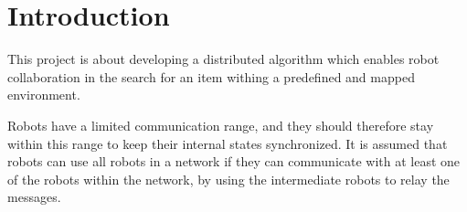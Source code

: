 \section{Introduction}
\label{sec:Introduction}

This project is about developing a distributed algorithm which enables robot collaboration in the search for an item withing a predefined and mapped environment.

{
\color{red}
Robots have a limited communication range, and they should therefore stay within this range to keep their internal states synchronized. It is assumed that robots can use all robots in a network if they can communicate with at least one of the robots within the network, by using the intermediate robots to relay the messages.
}

